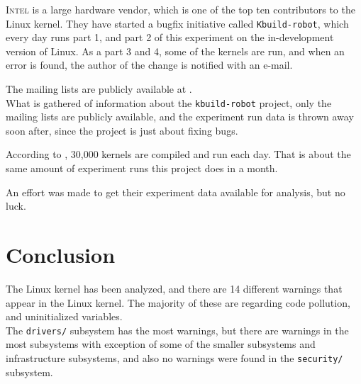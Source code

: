\documentclass[a4paper,11pt]{report}
\begin{document}
\textsc{Intel} is a large hardware vendor, which is one of the top ten 
contributors to the Linux kernel\cite{gkh}. They have started a bugfix 
initiative called \texttt{Kbuild-robot}, which every day runs part 1, and part 
2 of this experiment on the in-development version of Linux. As a part 3 and 4, 
some of the kernels are run, and when an error is found, the author of the change 
is notified with an e-mail.

The mailing lists are publicly available at 
\cite{kbuildrobot,kbuildrobotall,kbuildrobotlkp}.
\\

What is gathered of information about the \texttt{kbuild-robot} project, only 
the mailing lists are publicly available, and the experiment run data is thrown 
away soon after, since the project is just about fixing bugs.


According to \cite{summit2012,summit2013}, 30,000 kernels are compiled and run
each day. That is about the same amount of experiment runs this project does in 
a month.

An effort was made to get their experiment data available for analysis, but no 
luck.  

            \newpage
            \chapter{Conclusion}
The Linux kernel has been analyzed, and there are 14 different 
warnings that appear in the Linux kernel. The majority of these are regarding 
code pollution, and uninitialized variables.
\\

The \texttt{drivers/} subsystem has the most warnings, but there are warnings 
in the most subsystems with exception of some of the smaller subsystems and 
infrastructure subsystems, and also no warnings were found in the 
\texttt{security/} subsystem.
\\
\end{document}
